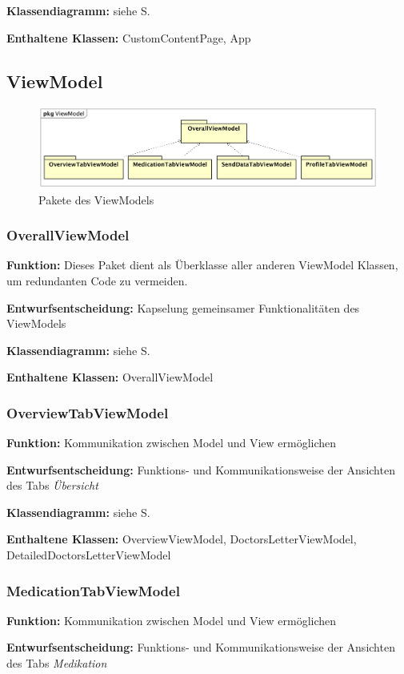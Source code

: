 \documentclass[a4paper]{scrreprt}
\begin{document}
\textbf{Klassendiagramm:} siehe S.

\textbf{Enthaltene Klassen:} CustomContentPage, App

\subsection{ViewModel}
\begin{figure}[H]
\centering
\includegraphics[width=0.75\textheight]{graphics/Klassendiagramme/ViewModel/ViewModelLayout.png}
\caption{Pakete des ViewModels}
\end{figure}
\subsubsection{OverallViewModel}
\textbf{Funktion:} Dieses Paket dient als Überklasse aller anderen ViewModel Klassen, um redundanten Code zu vermeiden.

\textbf{Entwurfsentscheidung:} Kapselung gemeinsamer Funktionalitäten des ViewModels

\textbf{Klassendiagramm:} siehe S.

\textbf{Enthaltene Klassen:} OverallViewModel

\subsubsection{OverviewTabViewModel}
\textbf{Funktion:} Kommunikation zwischen Model und View ermöglichen

\textbf{Entwurfsentscheidung:} Funktions- und Kommunikationsweise der Ansichten des Tabs \textit{Übersicht}

\textbf{Klassendiagramm:} siehe S.

\textbf{Enthaltene Klassen:} OverviewViewModel, DoctorsLetterViewModel, DetailedDoctorsLetterViewModel

\subsubsection{MedicationTabViewModel}
\textbf{Funktion:} Kommunikation zwischen Model und View ermöglichen

\textbf{Entwurfsentscheidung:} Funktions- und Kommunikationsweise der Ansichten des Tabs \textit{Medikation}
\end{document}
